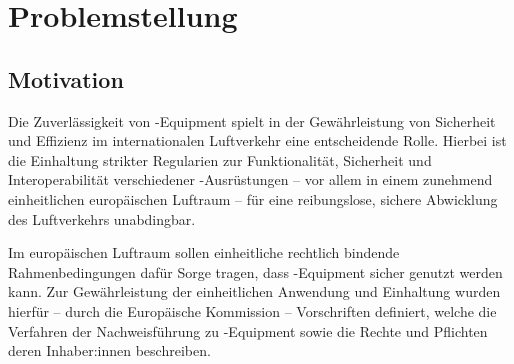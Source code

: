 \chapter{Problemstellung}

\section{Motivation}

    
    Die Zuverlässigkeit von \atmans-Equipment spielt in der Gewährleistung von Sicherheit und Effizienz im internationalen Luftverkehr eine entscheidende Rolle. 
    Hierbei ist die Einhaltung strikter Regularien zur Funktionalität, Sicherheit und Interoperabilität verschiedener \atmans-Ausrüstungen -- vor allem in einem zunehmend einheitlichen europäischen Luftraum -- für eine reibungslose, sichere Abwicklung des Luftverkehrs unabdingbar. 

    \medskip
    Im europäischen Luftraum sollen einheitliche rechtlich bindende Rahmenbedingungen dafür Sorge tragen, dass \atmans-Equipment sicher genutzt werden kann.
    Zur Gewährleistung der einheitlichen Anwendung und Einhaltung wurden hierfür -- durch die Europäische Kommission -- Vorschriften definiert, welche die Verfahren der Nachweisführung zu \atmans{}-Equip\-ment sowie die Rechte und Pflichten deren Inhaber:innen beschreiben. \cite[Art. 43]{2018R1139} 
        
